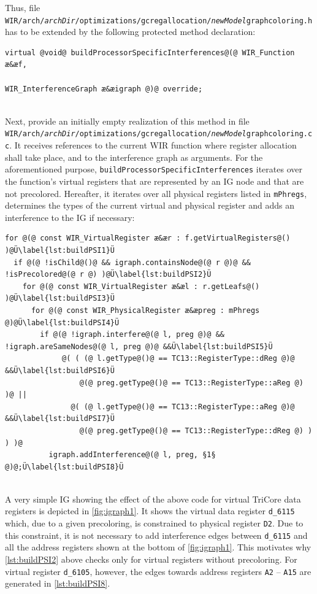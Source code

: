 Thus, file \texttt{WIR/arch/{\itshape archDir}/optimizations/gcregallocation/{\itshape newModel}\-graphcoloring.h} has to be extended by the following protected method declaration: \\
\begin{lstlisting}[style=code,float=!ht,aboveskip=-0.8 \baselineskip,belowskip=-0.8 \baselineskip]
virtual @void@ buildProcessorSpecificInterferences@(@ WIR_Function æ&æf,
                                                  WIR_InterferenceGraph æ&æigraph @)@ override;
\end{lstlisting}
\\
Next, provide an initially empty realization of this method in file \texttt{WIR/arch/{\itshape archDir}/optimizations/gcreg\-allocation/{\itshape newModel}\-graphcoloring.cc}.
It receives references to the current \gls{WIR} function where register allocation shall take place, and to the interference graph as arguments.
For the aforementioned purpose, \texttt{buildProcessorSpecificInterferences} iterates over the function's virtual registers that are represented by an \gls{IG} node and that are not precolored.
Hereafter, it iterates over all physical registers listed in \texttt{mPhregs}, determines the types of the current virtual and physical register and adds an interference to the \gls{IG} if necessary: \\
\begin{lstlisting}[style=code,float=!ht,aboveskip=-0.8 \baselineskip,belowskip=-0.8 \baselineskip]
for @(@ const WIR_VirtualRegister æ&ær : f.getVirtualRegisters@() )@Ü\label{lst:buildPSI1}Ü
  if @(@ !isChild@()@ && igraph.containsNode@(@ r @)@ && !isPrecolored@(@ r @) )@Ü\label{lst:buildPSI2}Ü
    for @(@ const WIR_VirtualRegister æ&æl : r.getLeafs@() )@Ü\label{lst:buildPSI3}Ü
      for @(@ const WIR_PhysicalRegister æ&æpreg : mPhregs @)@Ü\label{lst:buildPSI4}Ü
        if @(@ !igraph.interfere@(@ l, preg @)@ && !igraph.areSameNodes@(@ l, preg @)@ &&Ü\label{lst:buildPSI5}Ü
             @( ( (@ l.getType@()@ == TC13::RegisterType::dReg @)@ &&Ü\label{lst:buildPSI6}Ü
                 @(@ preg.getType@()@ == TC13::RegisterType::aReg @) )@ ||
               @( (@ l.getType@()@ == TC13::RegisterType::aReg @)@ &&Ü\label{lst:buildPSI7}Ü
                 @(@ preg.getType@()@ == TC13::RegisterType::dReg @) ) ) )@
          igraph.addInterference@(@ l, preg, §1§ @)@;Ü\label{lst:buildPSI8}Ü
\end{lstlisting}
\\
A very simple \gls{IG} showing the effect of the above code for virtual TriCore data registers is depicted in \cref{fig:igraph1}.
It shows the virtual data register \texttt{d\_6115} which, due to a given precoloring, is constrained to physical register \texttt{D2}.
Due to this constraint, it is not necessary to add interference edges between \texttt{d\_6115} and all the address registers shown at the bottom of \cref{fig:igraph1}.
This motivates why \cref{lst:buildPSI2} above checks only for virtual registers without precoloring.
For virtual register \texttt{d\_6105}, however, the edges towards address registers \texttt{A2} -- \texttt{A15} are generated in \cref{lst:buildPSI8}.

